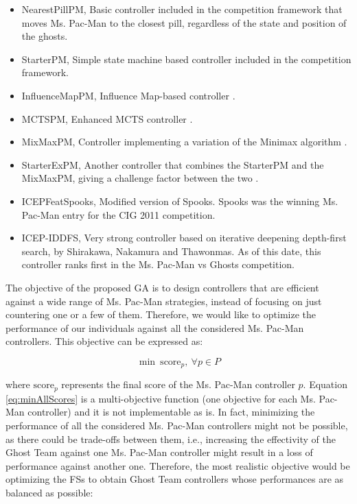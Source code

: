 \documentclass[journal]{IEEEtran}
\begin{document}
\begin{itemize}
  \item NearestPillPM, Basic controller included in the competition framework that moves Ms. Pac-Man to the closest pill, regardless of the state and position of the ghosts.
  \item StarterPM, Simple state machine based controller included in the competition framework.
  \item InfluenceMapPM, Influence Map-based controller \cite{Svensson2012}.
  \item MCTSPM, Enhanced MCTS controller \cite{Pepels2012}.
  \item MixMaxPM, Controller implementing a variation of the Minimax algorithm \cite{Cardona13}.
  \item StarterExPM, Another controller that combines the StarterPM and the MixMaxPM, giving a challenge factor between the two \cite{Cardona13}.
  \item ICEPFeatSpooks, Modified version of Spooks. Spooks was the winning Ms. Pac-Man entry for the CIG 2011 competition.
  \item ICEP-IDDFS, Very strong controller based on iterative deepening depth-first search, by Shirakawa, Nakamura and Thawonmas. As of this date, this controller ranks first in the Ms. Pac-Man vs Ghosts competition.
\end{itemize}

The objective of the proposed GA is to design controllers that are efficient against a wide range of Ms. Pac-Man strategies, instead of focusing on just countering one or a few of them. Therefore, we would like to optimize the performance of our individuals against all the considered Ms. Pac-Man controllers. This objective can be expressed as:

\begin{equation}
\label{eq:minAllScores}
	\min \: \text{score}_p, \: \forall p \in P
\end{equation}

where $\text{score}_p$ represents the final score of the Ms. Pac-Man controller $p$. Equation \eqref{eq:minAllScores} is a multi-objective function (one objective for each Ms. Pac-Man controller) and it is not implementable as is. In fact, minimizing the performance of all the considered Ms. Pac-Man controllers might not be possible, as there could be trade-offs between them, i.e., increasing the effectivity of the Ghost Team against one Ms. Pac-Man controller might result in a loss of performance against another one. Therefore, the most realistic objective would be optimizing the FSs to obtain Ghost Team controllers whose performances are as balanced as possible:
\end{document}
